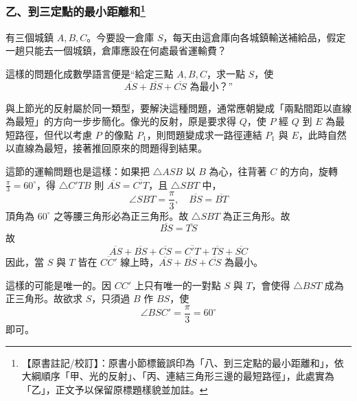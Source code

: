 \subsubsection*{乙、到三定點的最小距離和\label{note:b3-ch5-p251-sec-title}\footnote{【原書註記/校訂】：原書小節標籤誤印為「八、到三定點的最小距離和」，依大綱順序「甲、光的反射」、「丙、連結三角形三邊的最短路徑」，此處實為「乙」，正文予以保留原標題樣貌並加註。}}

\begin{example}[論例 7]
有三個城鎮 $A, B, C$。今要設一倉庫 $S$，每天由這倉庫向各城鎮輸送補給品，假定一趟只能去一個城鎮，倉庫應設在何處最省運輸費？
\end{example}

這樣的問題化成數學語言便是“給定三點 $A, B, C$，求一點 $S$，使
\[ \overline{AS} + \overline{BS} + \overline{CS} \text{ 為最小？”} \]

與上節光的反射屬於同一類型，要解決這種問題，通常應朝變成「兩點間距以直線為最短」的方向一步步簡化。像光的反射，原是要求得 $Q$，使 $P$ 經 $Q$ 到 $E$ 為最短路徑，但代以考慮 $P$ 的像點 $P_1$，則問題變成求一路徑連結 $P_1$ 與 $E$，此時自然以直線為最短，接著推回原來的問題得到結果。

這節的運輸問題也是這樣：如果把 $\triangle ASB$ 以 $B$ 為心，往背著 $C$ 的方向，旋轉 $\frac{\pi}{3} = 60^\circ$，得 $\triangle C'TB$ 則 $\overline{AS} = \overline{C'T}$，且 $\triangle SBT$ 中，
\[ \angle SBT = \frac{\pi}{3},\quad \overline{BS} = \overline{BT} \]
頂角為 $60^\circ$ 之等腰三角形必為正三角形。故 $\triangle SBT$ 為正三角形。故
\[ \overline{BS} = \overline{TS} \]
故
\[ \overline{AS} + \overline{BS} + \overline{CS} = \overline{C'T} + \overline{TS} + \overline{SC} \]
因此，當 $S$ 與 $T$ 皆在 $\overline{CC'}$ 線上時，$\overline{AS} + \overline{BS} + \overline{CS}$ 為最小。

這樣的可能是唯一的。因 $CC'$ 上只有唯一的一對點 $S$ 與 $T$，會使得 $\triangle BST$ 成為正三角形。故欲求 $S$，只須過 $B$ 作 $BS$，使
\[ \angle BSC' = \frac{\pi}{3} = 60^\circ \]
即可。


